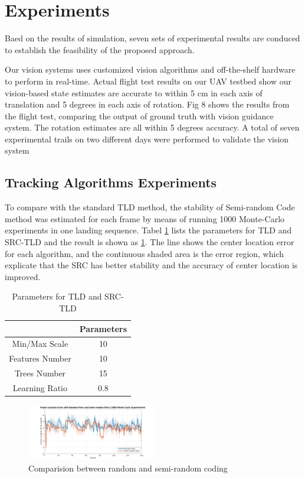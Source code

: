  
\section{Experiments}

Baed on the results of simulation,  seven sets of experimental results are conduced to establish the feasibility of the proposed approach.

Our vision systems uses customized vision algorithms and off-the-shelf hardware to perform in real-time.
Actual flight test results on our UAV testbed show our vision-based state estimates are accurate to within 5 cm in each axis of translation and 5 degrees in each axis of rotation.
Fig 8 shows the results from the flight test, comparing the output of ground truth with vision guidance system.
The rotation estimates are all within 5 degrees accuracy.
A total of seven experimental trails on two different days were performed to validate the vision system



\subsection{Tracking Algorithms Experiments}

To compare with the standard TLD method, the stability of Semi-random Code method was estimated for each frame by means of running 1000 Monte-Carlo experiments in one landing sequence. Tabel \ref{lab:TLD_params} lists the parameters for TLD and SRC-TLD and the result is shown as \ref{fig:chp04_24_random_semi_random_monte_carlo}. The line shows the center location error for each algorithm, and the continuous shaded area is the error region, which explicate that the SRC has better stability and the accuracy of center location is improved. 

\begin{table}[]
	\centering
	\caption{Parameters for TLD and SRC-TLD}
	\label{lab:TLD_params}
	\begin{tabular}{cc}
		\hline
		& \textbf{Parameters} \\ \hline
		Min/Max Scale & 10 \\
		Features Number & 10 \\
		Trees Number & 15 \\
		Learning Ratio & 0.8 \\ \hline
	\end{tabular}
\end{table}

\begin{figure}[!th]
	\centering
	\includegraphics[width=0.5\textwidth]{Figs/chp04_24_random_semi_random_monte_carlo.pdf}
	\caption{Comparision between random and semi-random coding}
	\label{fig:chp04_24_random_semi_random_monte_carlo}    
\end{figure}

